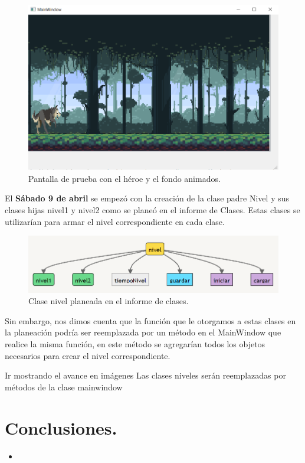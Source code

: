 \documentclass{article}
\begin{document}
\begin{figure}[h]
\includegraphics[scale=0.6]{Images/animaciones.png}
\centering
\caption{Pantalla de prueba con el héroe y el fondo animados.}
\label{fig:animacion}
\end{figure}

El \textbf{Sábado 9 de abril} se empezó con la creación de la clase padre Nivel y sus clases hijas nivel1 y nivel2 como se planeó en el informe de Clases. Estas clases se utilizarían para armar el nivel correspondiente en cada clase.

\newpage
\begin{figure}[h]
\includegraphics[scale=0.6]{Images/niveles.png}
\centering
\caption{Clase nivel planeada en el informe de clases.}
\label{fig:niveles}
\end{figure}

Sin embargo, nos dimos cuenta que la función que le otorgamos a estas clases en la planeación podría ser reemplazada por un método en el MainWindow que realice la misma función, en este método se agregarían todos los objetos necesarios para crear el nivel correspondiente.



Ir mostrando el avance en imágenes
Las clases niveles serán reemplazadas por métodos de la clase mainwindow

    




\section{Conclusiones.}
    \begin{itemize}
        \item
    \end{itemize}
\end{document}
